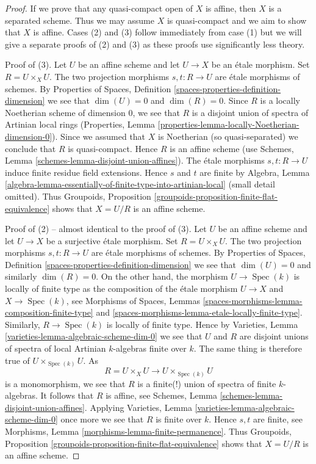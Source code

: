 \documentclass{stacks-project}
\theoremstyle{plain}
\theoremstyle{definition}
\theoremstyle{remark}
\numberwithin{equation}{subsection}
\def\Spec{\mathop{\mathrm{Spec}}}
\begin{document}
\begin{proof}
If we prove that any quasi-compact open of $X$ is affine, then
$X$ is a separated scheme. Thus we may assume $X$ is quasi-compact
and we aim to show that $X$ is affine.
Cases (2) and (3) follow immediately from case (1) but we will give a separate
proofs of (2) and (3) as these proofs use significantly less theory.

\medskip\noindent
Proof of (3). Let $U$ be an affine scheme and let $U \to X$ be an
\'etale morphism. Set $R = U \times_X U$. The two projection
morphisms $s, t : R \to U$ are \'etale morphisms of schemes. By
Properties of Spaces, Definition \ref{spaces-properties-definition-dimension}
we see that $\dim(U) = 0$ and $\dim(R) = 0$.
Since $R$ is a locally Noetherian scheme of dimension $0$,
we see that $R$ is a disjoint union of spectra of
Artinian local rings
(Properties, Lemma \ref{properties-lemma-locally-Noetherian-dimension-0}).
Since we assumed that $X$ is Noetherian (so quasi-separated) we
conclude that $R$ is quasi-compact. Hence $R$ is an affine scheme
(use Schemes, Lemma \ref{schemes-lemma-disjoint-union-affines}).
The \'etale morphisms $s, t : R \to U$ induce finite residue field
extensions. Hence $s$ and $t$ are finite by
Algebra, Lemma
\ref{algebra-lemma-essentially-of-finite-type-into-artinian-local}
(small detail omitted). 
Thus
Groupoids, Proposition \ref{groupoids-proposition-finite-flat-equivalence}
shows that $X = U/R$ is an affine scheme.

\medskip\noindent
Proof of (2) -- almost identical to the proof of (3).
Let $U$ be an affine scheme and let $U \to X$ be a surjective \'etale morphism.
Set $R = U \times_X U$. The two projection morphisms
$s, t : R \to U$ are \'etale morphisms of schemes. By
Properties of Spaces, Definition \ref{spaces-properties-definition-dimension}
we see that $\dim(U) = 0$ and similarly $\dim(R) = 0$.
On the other hand, the morphism $U \to \Spec(k)$ is locally of finite
type as the composition of the \'etale morphism $U \to X$ and
$X \to \Spec(k)$, see
Morphisms of Spaces,
Lemmas \ref{spaces-morphisms-lemma-composition-finite-type} and
\ref{spaces-morphisms-lemma-etale-locally-finite-type}.
Similarly, $R \to \Spec(k)$ is locally of finite type.
Hence by
Varieties, Lemma \ref{varieties-lemma-algebraic-scheme-dim-0}
we see that $U$ and $R$ are disjoint unions of spectra of
local Artinian $k$-algebras finite over $k$. The same thing
is therefore true of $U \times_{\Spec(k)} U$. As
$$
R = U \times_X U \longrightarrow U \times_{\Spec(k)} U
$$
is a monomorphism, we see that $R$ is a finite(!) union of spectra of
finite $k$-algebras. It follows that $R$ is affine, see
Schemes, Lemma \ref{schemes-lemma-disjoint-union-affines}.
Applying
Varieties, Lemma \ref{varieties-lemma-algebraic-scheme-dim-0}
once more we see that $R$ is finite over $k$. Hence $s, t$
are finite, see
Morphisms, Lemma \ref{morphisms-lemma-finite-permanence}.
Thus
Groupoids, Proposition \ref{groupoids-proposition-finite-flat-equivalence}
shows that $X = U/R$ is an affine scheme.


\end{proof}
\end{document}
